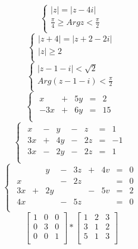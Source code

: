 \documentclass[a4paper]{article}
\begin{document}
$$ \begin{cases}
|z| = |z-4i|\\
\frac{\pi}{4} \geq Arg z < \frac{\pi}{2} \\
\end{cases} $$
$$ \begin{cases}
|z+4| = |z+2-2i|\\
|z| \geq 2 \\
\end{cases} $$
$$ \begin{cases}
|z-1-i| < \sqrt{2} \\
Arg(z-1-i) < \frac{\pi}{2} \\
\end{cases} $$
$$ \begin{cases}
\begin{array}{rrrrr}
x & + & 5y & = & 2\\
-3x & + & 6y & = & 15\\
\end{array}
\end{cases} $$
$$ \begin{cases}
\begin{array}{rrrrrrr} 
x & - & y & - & z & = & 1\\
3x & + & 4y & - & 2z & = & -1\\
3x & - & 2y & - & 2z & = & 1\\
\end{array}
\end{cases} $$
$$ \begin{cases}
\begin{array}{rrrrrrrrr} 
& & y & - & 3z & + & 4v & = & 0\\
x &  &  & - & 2z & & & = & 0\\
3x & + & 2y &  &  & - & 5v & = & 2\\
4x &  &  & - & 5z &  &  & = & 0\\
\end{array}
\end{cases} $$
$$\left[ \begin{array}{ccc}
1 & 0 & 0  \\
0 & 3 & 0  \\
0 & 0 & 1 \\
\end{array} \right]
*
\left[ \begin{array}{ccc}
1 & 2 & 3  \\
3 & 1 & 2  \\
5 & 1 & 3 \\
\end{array} \right]$$
\end{document}
